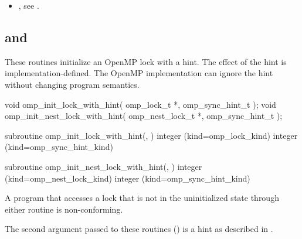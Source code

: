 \crossreferences
\begin{itemize}
\item {}, see
.
\end{itemize}











\subsection[\hcode{omp_init_lock_with_hint} and \\
\hcode{omp_init_nest_lock_with_hint}]{ and \\
}
\label{subsec:omp_init_lock_with_hint and omp_init_nest_lock_with_hint}
\summary
These routines initialize an OpenMP lock with a hint.
The effect of the hint is implementation-defined. The OpenMP implementation
can ignore the hint without changing program semantics.


\format
\begin{ccppspecific}
\begin{ompcFunction}
void omp_init_lock_with_hint(
  omp_lock_t *,
  omp_sync_hint_t 
);
void omp_init_nest_lock_with_hint(
  omp_nest_lock_t *,
  omp_sync_hint_t 
);
\end{ompcFunction}
\end{ccppspecific}


\begin{fortranspecific}
\begin{ompfSubroutine}
subroutine omp_init_lock_with_hint(, )
integer (kind=omp_lock_kind) 
integer (kind=omp_sync_hint_kind) 

subroutine omp_init_nest_lock_with_hint(, )
integer (kind=omp_nest_lock_kind) 
integer (kind=omp_sync_hint_kind) 
\end{ompfSubroutine}
\end{fortranspecific}

\constraints
A program that accesses a lock that is not in the uninitialized state through either routine
is non-conforming.

The second argument passed to these routines () is a hint
as described in .

